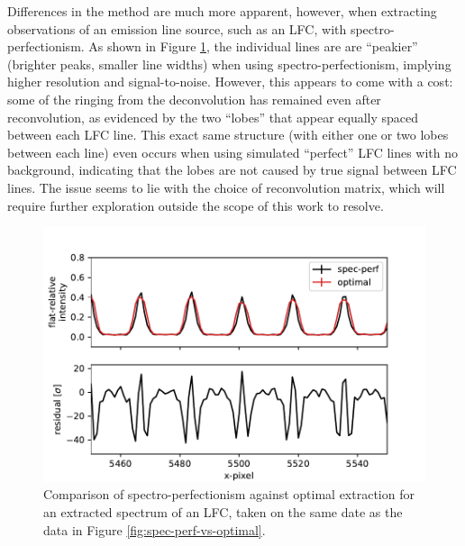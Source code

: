 Differences in the method are much more apparent, however, when extracting observations of an emission line source, such as an LFC, with spectro-perfectionism. As shown in Figure \ref{fig:spec-perf-vs-optimal-lfc}, the individual lines are are ``peakier'' (brighter peaks, smaller line widths) when using spectro-perfectionism, implying higher resolution and signal-to-noise. However, this appears to come with a cost: some of the ringing from the deconvolution has remained even after reconvolution, as evidenced by the two ``lobes'' that appear equally spaced between each LFC line. This exact same structure (with either one or two lobes between each line) even occurs when using simulated ``perfect'' LFC lines with no background, indicating that the lobes are not caused by true signal between LFC lines. The issue seems to lie with the choice of reconvolution matrix, which will require further exploration outside the scope of this work to resolve.

\begin{figure}
    \centering
    \includegraphics[width=\textwidth]{figures-5/spec-perf-vs-optimal-lfc.pdf}
    \caption[Spectro-perfectionism vs. optimal extraction -- Laser frequency comb spectrum]{Comparison of spectro-perfectionism against optimal extraction for an extracted spectrum of an LFC, taken on the same date as the data in Figure \ref{fig:spec-perf-vs-optimal}.}
    \label{fig:spec-perf-vs-optimal-lfc}
\end{figure}

